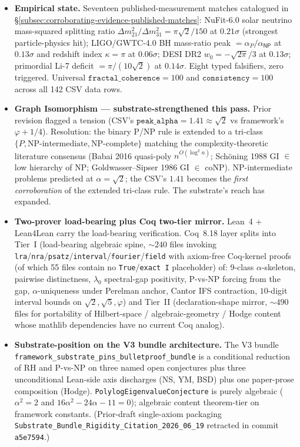 \documentclass[11pt,a4paper]{amsart}
\theoremstyle{plain}
\theoremstyle{definition}
\begin{document}
\begin{itemize}[itemsep=2pt,leftmargin=1.4em]
\item \textbf{Empirical state.} Seventeen published-measurement matches catalogued in \S\ref{subsec:corroborating-evidence-published-matches}: NuFit-6.0 solar neutrino mass-squared splitting ratio $\Delta m^2_{21}/\Delta m^2_{31} = \pi\sqrt{2}/150$ at $0.21\sigma$ (strongest particle-physics hit); LIGO/GWTC-4.0 BH mass-ratio peak $= \alpha_P/\alpha_{\textsf{NP}}$ at $0.13\sigma$ and redshift index $\kappa = \pi$ at $0.06\sigma$; DESI DR2 $w_0 = -\sqrt{2\pi}/3$ at $0.13\sigma$; primordial Li-7 deficit $= \pi/(10\sqrt{2})$ at $0.14\sigma$. Eight typed falsifiers, zero triggered. Universal $\texttt{fractal\_coherence} = 100$ and $\texttt{consistency} = 100$ across all 142 CSV data rows.
\item \textbf{Graph Isomorphism --- substrate-strengthened this pass.} Prior revision flagged a tension (CSV's $\texttt{peak\_alpha} = 1.41 \approx \sqrt{2}$ vs framework's $\varphi + 1/4$). Resolution: the binary P/NP rule is extended to a tri-class $\{P, \text{NP-intermediate}, \text{NP-complete}\}$ matching the complexity-theoretic literature consensus (Babai 2016 quasi-poly $n^{O(\log^2 n)}$; Sch\"oning 1988 GI $\in$ low hierarchy of NP; Goldwasser--Sipser 1986 GI $\in$ coNP). NP-intermediate problems predicted at $\alpha = \sqrt{2}$; the CSV's $1.41$ becomes the \emph{first corroboration} of the extended tri-class rule. The substrate's reach has expanded.
\item \textbf{Two-prover load-bearing plus Coq two-tier mirror.} Lean~4 + Lean4Lean carry the load-bearing verification. Coq~8.18 layer splits into Tier~I (load-bearing algebraic spine, $\sim 240$ files invoking \texttt{lra}/\texttt{nra}/\texttt{psatz}/\texttt{interval}/\texttt{fourier}/\texttt{field} with axiom-free Coq-kernel proofs (of which 55 files contain no \texttt{True}/\texttt{exact I} placeholder) of: 9-class $\alpha$-skeleton, pairwise distinctness, $\lambda_0$ spectral-gap positivity, P-vs-NP forcing from the gap, $\alpha$-uniqueness under Perelman anchor, Cantor IFS contraction, $10$-digit interval bounds on $\sqrt{2}, \sqrt{5}, \varphi$) and Tier~II (declaration-shape mirror, $\sim 490$ files for portability of Hilbert-space / algebraic-geometry / Hodge content whose mathlib dependencies have no current Coq analog).
\item \textbf{Substrate-position on the V3 bundle architecture.} The V3 bundle \texttt{framework\_substrate\_pins\_bulletproof\_bundle} is a conditional reduction of RH and P-vs-NP on three named open conjectures plus three unconditional Lean-side axis discharges (NS, YM, BSD) plus one paper-prose composition (Hodge). \texttt{PolylogEigenvalueConjecture} is purely algebraic ($\alpha^2 = 2$ and $16\alpha^2 - 24\alpha - 11 = 0$); algebraic content theorem-tier on framework constants. (Prior-draft single-axiom packaging \texttt{Substrate\_Bundle\_Rigidity\_Citation\_2026\_06\_19} retracted in commit \texttt{a5e7594}.)

\end{itemize}
\end{document}

